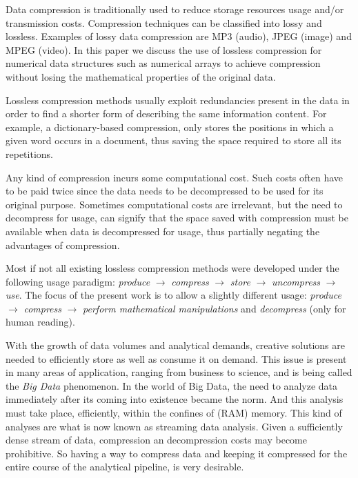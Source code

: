 \documentclass[10pt]{article}
\begin{document}
Data compression is traditionally used to reduce storage resources usage and/or transmission costs\cite{salomon}. Compression techniques can be classified into lossy and lossless. Examples of lossy data compression are MP3 (audio), JPEG (image) and MPEG (video). In this paper we discuss the use of lossless compression for numerical data structures such as numerical arrays to achieve compression without losing the mathematical properties of the original data.  

Lossless compression methods usually exploit redundancies present in the data in order to find a shorter form of describing the same information content. For example, a dictionary-based compression, only stores the positions in which a given word occurs in a document, thus saving the space required to store all its repetitions\cite{salomon2}. 

Any kind of compression incurs some computational cost. Such costs often have to be paid twice since the data needs to be decompressed to be used for its original purpose. Sometimes computational costs are irrelevant, but the need to decompress for usage, can signify that the space saved with compression must be available when data is decompressed for usage, thus partially negating the advantages of compression.

Most if not all existing lossless compression methods were developed under the following usage paradigm: \textit{produce} $\rightarrow$ \textit{compress} $\rightarrow$ \textit{store} $\rightarrow$ \textit{uncompress} $\rightarrow$ \textit{use}. The focus of the present work is to allow a slightly different usage:  \textit{produce} $\rightarrow$ \textit{compress} $\rightarrow$ \textit{perform mathematical manipulations} and \textit{decompress} (only for human reading).

With the growth of data volumes and analytical demands, creative solutions are needed to efficiently store as well as consume it on demand. This issue is present in many areas of application, ranging from business to science\cite{lynch}, and is being called the \textit{Big Data} phenomenon. In the world of Big Data, the need to analyze data immediately after its coming into existence became the norm. And this analysis must take place, efficiently, within the confines of (RAM) memory. This kind of analyses are what is now known as streaming data analysis\cite{gaber2005mining}. Given a sufficiently dense stream of data, compression an decompression costs may become prohibitive. So having a way to compress data and keeping it compressed for the entire course of the analytical pipeline, is very desirable.
\end{document}
